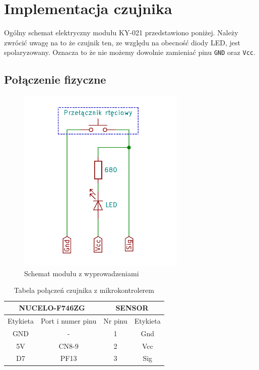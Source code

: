 \documentclass[11pt, a4paper]{article}
\begin{document}
\newpage

\section{Implementacja czujnika}
Ogólny schemat elektryczny modułu KY-021 przedstawiono poniżej. Należy zwrócić uwagę na to że czujnik
ten, ze względu na obecność diody LED, jest spolaryzowany. Oznacza to że nie możemy dowolnie zamieniać
pinu \texttt{GND} oraz \texttt{Vcc}.

\subsection{Połączenie fizyczne}

\vspace{0.5cm}
\begin{figure}[h!]
    \centering
    \includegraphics[width=8cm]{fig/KY-017/polaczenie_modulu/kicad.png}
    \caption{Schemat modułu z wyprowadzeniami}
    \label{fig:schemat_z_wyp}
\end{figure}
\vspace{0.5cm}

\vspace{0.5cm}
\begin{table}[h!]
    \centering
    \begin{tabular}{|c|c|c|c|} 
        \hline
        \multicolumn{2}{|c|}{NUCELO-F746ZG} & \multicolumn{2}{c|}{SENSOR}  \\ 
        \hline
        Etykieta & Port i numer pinu       & Nr pinu & Etykieta           \\ 
        \hline
        GND     & -                         & 1       & Gnd              \\
        5V      & CN8-9                     & 2       & Vcc              \\
        D7      & PF13                      & 3       & Sig             \\
        \hline
    \end{tabular}
    \caption{Tabela połączeń czujnika z mikrokontrolerem}
\end{table}
\vspace{0.5cm}
\end{document}
